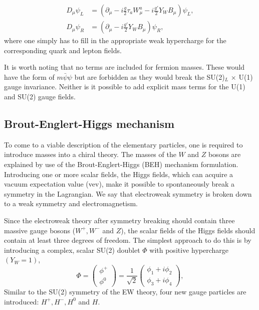 \begin{equation*}
\begin{split}
D_\mu \psi_L &= \left(\partial_\mu - i\frac{g}{2} \tau_a W^a_\mu - i \frac{g'}{2} Y_W B_\mu \right) \psi_L, \\
D_\mu \psi_R &= \left(\partial_\mu - i\frac{g'}{2} Y_W  B_\mu\right)\psi_R,
\end{split}
\end{equation*}
\noindent where one simply has to fill in the appropriate weak hypercharge for the corresponding quark and lepton fields.


It is worth noting that no terms are included for fermion masses. These would have the form of $m\bar{\psi}\psi$ but are forbidden as they would break the SU(2)$_L$ $\times$ U(1) gauge invariance. Neither is it possible to add explicit mass terms for the U(1) and SU(2) gauge fields. 
\subsection{Brout-Englert-Higgs mechanism}
\label{subsec:BEH}
To come to a viable description of the elementary particles, one is required to introduce masses into a chiral theory. The masses of the $W$ and $Z$ bosons are explained by use of the Brout-Englert-Higgs (BEH) mechanism formulation. Introducing one or more scalar fields, the Higgs fields, which can acquire a vacuum expectation value (vev), make it possible to spontaneously break a symmetry in the Lagrangian. We say that electroweak symmetry is broken down to a weak symmetry and electromagnetism. 

Since the electroweak theory after symmetry breaking should contain three massive gauge bosons ($W^+, W^-$ and $Z$), the scalar fields of the Higgs fields should contain at least three degrees of freedom. The simplest approach to do this is by introducing a complex, scalar SU(2) doublet $\Phi$ with positive hypercharge $\left(Y_W=1\right)$,
\begin{equation}
\label{eq:higgsdoublet}
\Phi = \begin{pmatrix} \phi^+ \\ \phi^0 \end{pmatrix} = \frac{1}{\sqrt{2}} \begin{pmatrix} \phi_1 + i\phi_2 \\ \phi_3 + i\phi_4 \end{pmatrix},
\end{equation}
Similar to the SU(2) symmetry of the EW theory, four new gauge particles are introduced: $H^+, H^-, H^0$ and $H$.


